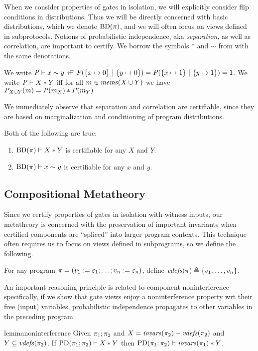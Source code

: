 When we consider properties
of gates in isolation, we will explicitly consider flip conditions in
distributions. Thus we will be directly concerned with basic distributions,
which we denote $\mathrm{BD}(\pi)$, and we will often focus on views
defined in subprotocols. 
Notions of probabilistic independence, aka \emph{separation}, as well
as correlation, are important to certify. We borrow the symbols $*$
and $\sim$ from \cite{barthe2019probabilistic} with the same
denotations.
\begin{definition}
  We write $\mathit{P} \vdash x \sim y$ iff $\mathit{P}(\{ x \mapsto 0\}\ |\ \{ y \mapsto 0 \}) =
  \mathit{P}(\{ x \mapsto 1\}\ |\ \{ y \mapsto 1 \}) = 1$.
  We write $\mathit{P} \vdash X * Y$ iff for all
    $m \in \mathit{mems}(X \cup Y)$ we have
  ${\mathit{P}}_{X \cup Y}(m) =
  \mathit{P}(m_X) * \mathit{P}(m_Y)$
\end{definition}
We immediately observe that separation and correlation are certifiable,
since they are based on marginalization and conditioning of program
distributions. 
\begin{lemma}
  \label{lemma-autosep}
  Both of the following are true:
  \begin{enumerate}
  \item $\mathrm{BD}(\pi) \vdash X * Y$ is certifiable for any $X$ and $Y$.
  \item $\mathrm{BD}(\pi) \vdash x \sim y$ is certifiable for any $x$ and $y$.
  \end{enumerate}
\end{lemma}

\subsection{Compositional Metatheory}
\label{section-automation-logic}

Since we certify properties of gates in isolation with witness inputs,
our metatheory is concerned with the preservation of important invariants
when certified components are ``spliced'' into larger program
contexts. This technique often requires us to focus on views defined
in subprograms, so we define the following.
\begin{definition}
For any program $\pi =
  (v_1 := \varepsilon_1;\ldots;v_n := \varepsilon_n)$, define
$\mathit{vdefs}(\pi) \triangleq \{ v_1,\ldots,v_n \}$.
\end{definition}

An important reasoning principle is related to component
noninterference- specifically, if we show that gate views enjoy a
noninterference property wrt their free (input) variables,
probabilistic independence propagates to other variables in the
preceding program.
\begin{restatable}[Noninterference]{lemma}{noninterference}
  \label{lemma-noninterference}
  Given $\pi_1;\pi_2$ and $X = \mathit{iovars}(\pi_2) - \mathit{vdefs}(\pi_2)$ and
  $Y \subseteq \mathit{vdefs}(\pi_2)$. If $\mathrm{PD}(\pi_1;\pi_2) \vdash X * Y$
  then $\mathrm{PD}(\pi_1;\pi_2) \vdash \mathit{iovars}(\pi_1) * Y$.
\end{restatable}

